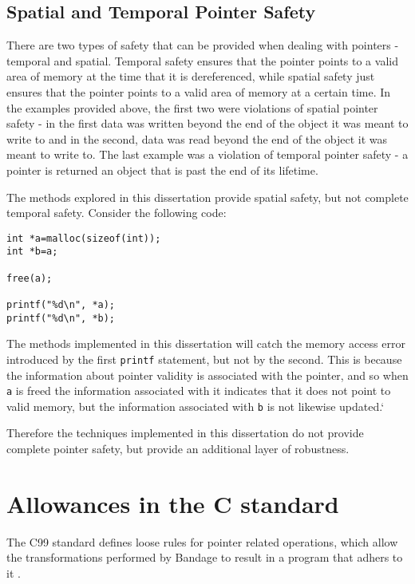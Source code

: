 \subsection{Spatial and Temporal Pointer Safety}

There are two types of safety that can be provided when dealing with pointers - temporal and spatial.
Temporal safety ensures that the pointer points to a valid area of memory at the time that it is dereferenced, while spatial safety just ensures that the pointer points to a valid area of memory at a certain time.
In the examples provided above, the first two were violations of spatial pointer safety - in the first data was written beyond the end of the object it was meant to write to and in the second, data was read beyond the end of the object it was meant to write to.
The last example was a violation of temporal pointer safety - a pointer is returned an object that is past the end of its lifetime.

The methods explored in this dissertation provide spatial safety, but not complete temporal safety.
Consider the following code:

\begin{verbatim}
int *a=malloc(sizeof(int));
int *b=a;

free(a);

printf("%d\n", *a);
printf("%d\n", *b);
\end{verbatim}

The methods implemented in this dissertation will catch the memory access error introduced by the first \verb!printf! statement, but not by the second.
This is because the information about pointer validity is associated with the pointer, and so when \verb!a! is freed the information associated with it indicates that it does not point to valid memory, but the information associated with \verb!b! is not likewise updated.`

Therefore the techniques implemented in this dissertation do not provide complete pointer safety, but provide an additional layer of robustness.

\section{Allowances in the C standard}

The C99 standard defines loose rules for pointer related operations, which allow the transformations performed by Bandage to result in a program that adhers to it \cite{c99all}.

